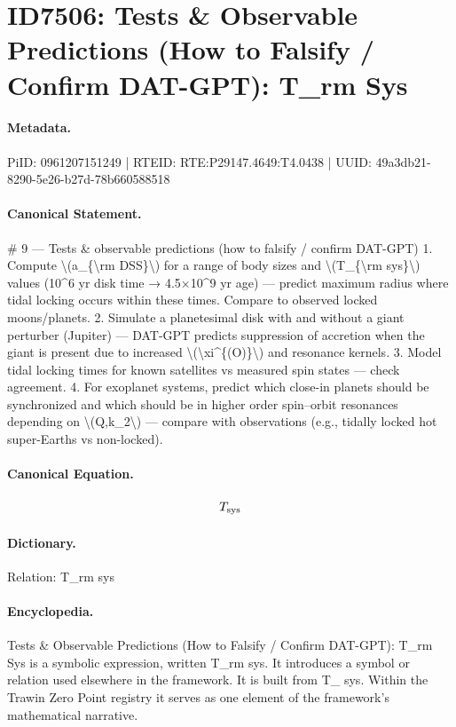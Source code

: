 \section*{ID7506: Tests \& Observable Predictions (How to Falsify / Confirm DAT-GPT): T\_rm Sys}
\paragraph{Metadata.}
PiID: 0961207151249 | RTEID: RTE:P29147.4649:T4.0438 | UUID: 49a3db21-8290-5e26-b27d-78b660588518

\paragraph{Canonical Statement.}
\# 9 — Tests \& observable predictions (how to falsify / confirm DAT-GPT) 1. Compute \textbackslash{}(a\_\{\textbackslash{}rm DSS\}\textbackslash{}) for a range of body sizes and \textbackslash{}(T\_\{\textbackslash{}rm sys\}\textbackslash{}) values (10\textasciicircum{}6 yr disk time → 4.5×10\textasciicircum{}9 yr age) — predict maximum radius where tidal locking occurs within these times. Compare to observed locked moons/planets. 2. Simulate a planetesimal disk with and without a giant perturber (Jupiter) — DAT-GPT predicts suppression of accretion when the giant is present due to increased \textbackslash{}(\textbackslash{}xi\textasciicircum{}\{(O)\}\textbackslash{}) and resonance kernels. 3. Model tidal locking times for known satellites vs measured spin states — check agreement. 4. For exoplanet systems, predict which close-in planets should be synchronized and which should be in higher order spin–orbit resonances depending on \textbackslash{}(Q,k\_2\textbackslash{}) — compare with observations (e.g., tidally locked hot super-Earths vs non-locked).

\paragraph{Canonical Equation.}
\[
T_{\rm sys}
\]

\paragraph{Dictionary.}
Relation: T\_rm sys

\paragraph{Encyclopedia.}
Tests \& Observable Predictions (How to Falsify / Confirm DAT-GPT): T\_rm Sys is a symbolic expression, written T\_rm sys. It introduces a symbol or relation used elsewhere in the framework. It is built from T\_ sys. Within the Trawin Zero Point registry it serves as one element of the framework's mathematical narrative.
